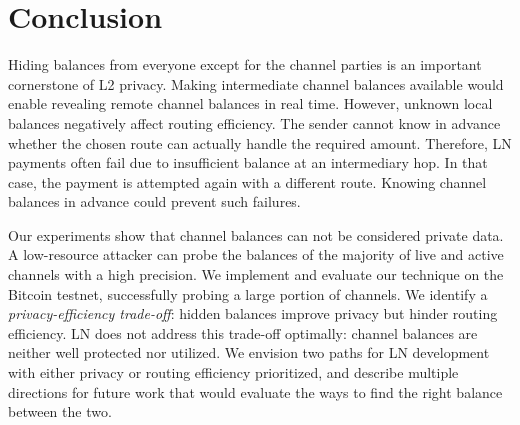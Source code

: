 \section{Conclusion} \label{sec:conclusion}

Hiding balances from everyone except for the channel parties is an important cornerstone of L2 privacy.
Making intermediate channel balances available would enable revealing remote channel balances in real time.
However, unknown local balances negatively affect routing efficiency.
The sender cannot know in advance whether the chosen route can actually handle the required amount.
Therefore, LN payments often fail due to insufficient balance at an intermediary hop.
In that case, the payment is attempted again with a different route.
Knowing channel balances in advance could prevent such failures.

Our experiments show that channel balances can not be considered private data.
A low-resource attacker can probe the balances of the majority of live and active channels with a high precision.
We implement and evaluate our technique on the Bitcoin testnet, successfully probing a large portion of channels.
We identify a \textit{privacy-efficiency trade-off}: hidden balances improve privacy but hinder routing efficiency.
LN does not address this trade-off optimally: channel balances are neither well protected nor utilized.
We envision two paths for LN development with either privacy or routing efficiency prioritized, and describe multiple directions for future work that would evaluate the ways to find the right balance between the two.